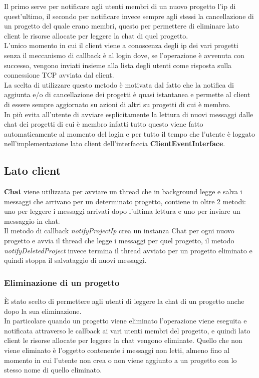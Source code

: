 \documentclass[11pt]{report}
\begin{document}
	Il primo serve per notificare agli utenti membri di un nuovo progetto l'ip di quest'ultimo, il secondo per notificare invece sempre agli stessi la cancellazione di un progetto del quale erano membri, questo per permettere di eliminare lato client le risorse allocate per leggere la chat di quel progetto.\\
	L'unico momento in cui il client viene a conoscenza degli ip dei vari progetti senza il meccanismo di callback è al login dove, se l'operazione è avvenuta con successo, vengono inviati insieme alla lista degli utenti come risposta sulla connessione TCP avviata dal client.\\
	La scelta di utilizzare questo metodo è motivata dal fatto che la notifica di aggiunta e/o di cancellazione dei progetti è quasi istantanea e permette al client di essere sempre aggiornato su azioni di altri su progetti di cui è membro. \\
	In più evita all'utente di avviare esplicitamente la lettura di nuovi messaggi dalle chat dei progetti di cui è membro infatti tutto questo viene fatto automaticamente al momento del login e per tutto il tempo che l'utente è loggato nell'implementazione lato client dell'interfaccia \textbf{ClientEventInterface}.
	
	\subsection{Lato client}
	\textbf{Chat} viene utilizzata per avviare un thread che in background legge e salva i messaggi che arrivano per un determinato progetto, contiene in oltre 2 metodi: uno per leggere i messaggi arrivati dopo l'ultima lettura e uno per inviare un messaggio in chat. \\
	Il metodo di callback \textit{notifyProjectIp} crea un instanza Chat per ogni nuovo progetto e avvia il thread che legge i messaggi per quel progetto, il metodo \textit{notifyDeletedProject} invece termina il thread avviato per un progetto eliminato e quindi stoppa il salvataggio di nuovi messaggi.
	
	\subsubsection{Eliminazione di un progetto}
	È stato scelto di permettere agli utenti di leggere la chat di un progetto anche dopo la sua eliminazione.\\
	In particolare quando un progetto viene eliminato l'operazione viene eseguita e notificata attraverso le callback ai vari utenti membri del progetto, e quindi lato client le risorse allocate per leggere la chat vengono eliminate. Quello che non viene eliminato è l'oggetto contenente i messaggi non letti, almeno fino al momento in cui l'utente non crea o non viene aggiunto a un progetto con lo stesso nome di quello eliminato.
	
\end{document}
